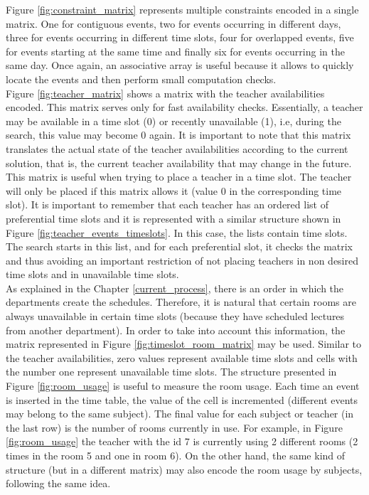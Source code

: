 Figure \ref{fig:constraint_matrix} represents multiple constraints encoded in a single matrix. One for contiguous events, two for events occurring in different days, three for events occurring in different time slots, four for overlapped events, five for events starting at the same time and finally six for events occurring in the same day. Once again, an associative array is useful because it allows to quickly locate the events and then perform small computation checks.\\
Figure \ref {fig:teacher_matrix} shows a matrix with the teacher availabilities encoded. This matrix serves only for fast availability checks. Essentially, a teacher may be available in a time slot (0) or recently unavailable (1), i.e, during the search, this value may become 0 again. It is important to note that this matrix translates the actual state of the teacher availabilities according to the current solution, that is, the current teacher availability that may change in the future. This matrix is useful when trying to place a teacher in a time slot. The teacher will only be placed if this matrix allows it (value 0 in the corresponding time slot). It is important to remember that each teacher has an ordered list of preferential time slots and it is represented with a similar structure shown in Figure \ref{fig:teacher_events_timeslots}. In this case, the lists contain time slots. The search starts in this list, and for each preferential slot, it checks the matrix and thus avoiding an important restriction of not placing teachers in non desired time slots and in unavailable time slots.\\
As explained in the Chapter \ref{current_process}, there is an order in which the departments create the schedules. Therefore, it is natural that certain rooms are always unavailable in certain time slots (because they have scheduled lectures from another department). In order to take into account this information, the matrix represented in Figure \ref{fig:timeslot_room_matrix} may be used. Similar to the teacher availabilities, zero values represent available time slots and cells with the number one represent unavailable time slots. The structure presented in Figure \ref{fig:room_usage} is useful to measure the room usage. Each time an event is inserted in the time table, the value of the cell is incremented (different events may belong to the same subject). The final value for each subject or teacher (in the last row) is the number of rooms currently in use. For example, in Figure \ref{fig:room_usage} the teacher with the id 7 is currently using 2 different rooms (2 times in the room 5 and one in room 6). On the other hand, the same kind of structure (but in a different matrix) may also encode the room usage by subjects, following the same idea.

